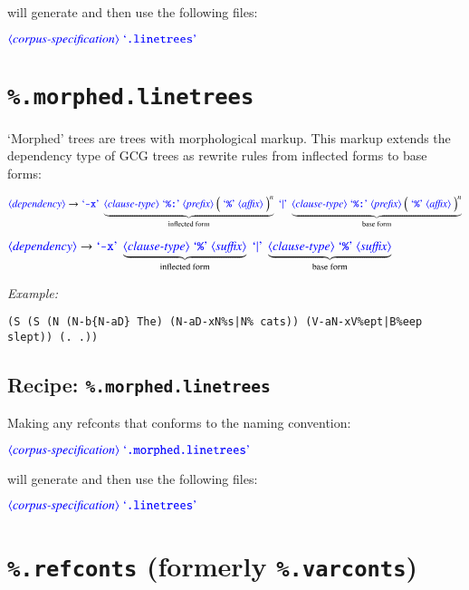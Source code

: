 \documentclass[12pt]{report}
\def\blue{\color{blue}}
\def\magenta{\color{magenta}}
\def\red{\color{red}}
\begin{document}
will generate and then use the following files:

$\dtype{corpus-specification} \ \dcode{.linetrees}$


\section{\blue\tt \%.morphed.linetrees}

`Morphed' trees are trees with morphological markup.
%
This markup extends the dependency type of GCG trees as rewrite rules from inflected forms to base forms:

$\dtype{dependency} \rightarrow \dcode{-x} \ \underbrace{\dtype{clause-type} \ \dcode{\%:} \ \dtype{prefix} \ \Big( \ \dcode{\%} \ \dtype{affix} \ \Big)^n}_\text{inflected form}
                             \ \dcode{$|$} \ \underbrace{\dtype{clause-type} \ \dcode{\%:} \ \dtype{prefix} \ \Big( \ \dcode{\%} \ \dtype{affix} \ \Big)^n}_\text{base form}$

$\dtype{dependency} \rightarrow \dcode{-x} \ \underbrace{\dtype{clause-type} \ \dcode{\%} \ \dtype{suffix}}_\text{inflected form}
                             \ \dcode{$|$} \ \underbrace{\dtype{clause-type} \ \dcode{\%} \ \dtype{suffix}}_\text{base form}$


\textit{Example:}
{\magenta\begin{verbatim}
(S (S (N (N-b{N-aD} The) (N-aD-xN%s|N% cats)) (V-aN-xV%ept|B%eep slept)) (. .))
\end{verbatim}
}

\subsection{Recipe: {\blue\tt \%.morphed.linetrees}}


Making any refconts that conforms to the naming convention:

$\dtype{corpus-specification} \ \dcode{.morphed.linetrees}$

will generate and then use the following files:

$\dtype{corpus-specification} \ \dcode{.linetrees}$


\section{{\blue\tt \%.refconts} (formerly {\red\tt \%.varconts})}
\label{sect:refconts}
\end{document}
